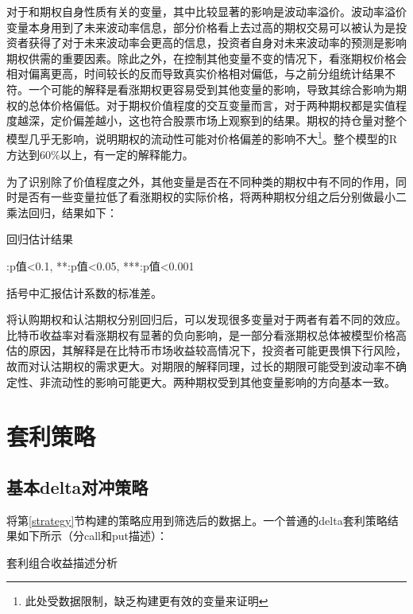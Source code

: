\par{对于和期权自身性质有关的变量，其中比较显著的影响是波动率溢价。波动率溢价变量本身用到了未来波动率信息，部分价格看上去过高的期权交易可以被认为是投资者获得了对于未来波动率会更高的信息，投资者自身对未来波动率的预测是影响期权供需的重要因素。除此之外，在控制其他变量不变的情况下，看涨期权价格会相对偏离更高，时间较长的反而导致真实价格相对偏低，与之前分组统计结果不符。一个可能的解释是看涨期权更容易受到其他变量的影响，导致其综合影响为期权的总体价格偏低。对于期权价值程度的交互变量而言，对于两种期权都是实值程度越深，定价偏差越小，这也符合股票市场上观察到的结果。期权的持仓量对整个模型几乎无影响，说明期权的流动性可能对价格偏差的影响不大\footnote{此处受数据限制，缺乏构建更有效的变量来证明}。整个模型的R方达到60$\%$以上，有一定的解释能力。}
\par{为了识别除了价值程度之外，其他变量是否在不同种类的期权中有不同的作用，同时是否有一些变量拉低了看涨期权的实际价格，将两种期权分组之后分别做最小二乘法回归，结果如下：}
\newpage
{}
\begin{center}
    \begin{threeparttable}[H]

        \caption{回归估计结果}

        
        \begin{tablenotes}
            \footnotesize
            \item *:p值<0.1, **:p值<0.05, ***:p值<0.001
            \item 括号中汇报估计系数的标准差。
        \end{tablenotes}
    \end{threeparttable}
\end{center}
\newpage
\restoregeometry
将认购期权和认沽期权分别回归后，可以发现很多变量对于两者有着不同的效应。比特币收益率对看涨期权有显著的负向影响，是一部分看涨期权总体被模型价格高估的原因，其解释是在比特币市场收益较高情况下，投资者可能更畏惧下行风险，故而对认沽期权的需求更大。对期限的解释同理，过长的期限可能受到波动率不确定性、非流动性的影响可能更大。两种期权受到其他变量影响的方向基本一致。
\section{套利策略}
\subsection{基本delta对冲策略}
将第\ref{strategy}节构建的策略应用到筛选后的数据上。一个普通的delta套利策略结果如下所示（分call和put描述）： 
~\\ 
\begin{table}[H]
    \caption{套利组合收益描述分析}
    \centering
    
    
\end{table}

